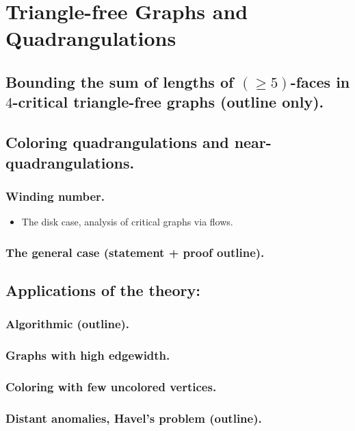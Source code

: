 \documentclass[12pt,twoside,openright,a4paper]{book}
\begin{document}
\chapter{Triangle-free Graphs and Quadrangulations}


\section{Bounding the sum of lengths of $(\ge\!5)$-faces in $4$-critical triangle-free graphs (outline only).}
\section{Coloring quadrangulations and near-quadrangulations.}

\subsection{ Winding number.}
\begin{itemize}
\item The disk case, analysis of critical graphs via flows.
\end{itemize}

\subsection{The general case (statement + proof outline).}

\section{Applications of the theory:}
\subsection{Algorithmic (outline).}
\subsection{Graphs with high edgewidth.}
\subsection{Coloring with few uncolored vertices.}
\subsection{Distant anomalies, Havel's problem (outline).}
\end{document}

